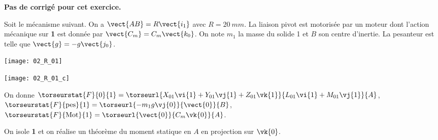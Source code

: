 \normaltrue
\correctionfalse


\setcounter{numques}{0}

\ifcorrection
\else
\textbf{Pas de corrigé pour cet exercice.}
\fi

\ifprof
\else
Soit le mécanisme suivant. On a $\vect{AB}=R\vect{i_1}$ avec $R=\SI{20}{mm}$. La liaison pivot est motorisée par un moteur dont l'action mécanique sur \textbf{1} est donnée par $\vect{C_m}=C_m \vect{k_0}$.
On note $m_1$ la masse du solide 1 et $B$ son centre d'inertie. 
 La pesanteur est telle que $\vect{g}=-g\vect{j_0}$.

\begin{center}
\texttt{[image: 02\_R\_01]}
\end{center}
\fi

\ifprof

\begin{center}
\texttt{[image: 02\_R\_01\_c]}
\end{center}
\else
\fi

On donne 
$\torseurstat{F}{0}{1}=\torseurl{X_{01}\vi{1}+Y_{01}\vj{1}+Z_{01}\vk{1}}{L_{01}\vi{1}+M_{01}\vj{1}}{A}$,
$\torseurstat{F}{\text{pes}}{1}=\torseurl{-m_1g\vj{0}}{\vect{0}}{B}$, 
$\torseurstat{F}{\text{Mot}}{1}=\torseurl{\vect{0}}{C_m\vk{0}}{A}$.

On isole \textbf{1} et on réalise un théorème du moment statique en $A$ en projection sur $\vk{0}$.

\ifprof
\else
\fi


\ifprof
\else
\fi

